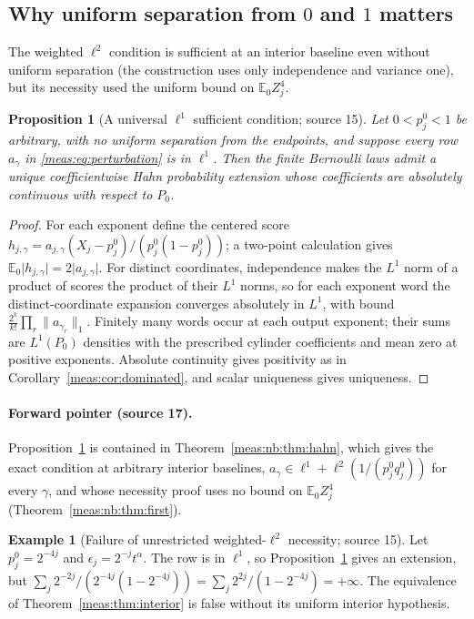 \documentclass[11pt]{article}
\numberwithin{equation}{section}
\newtheorem{proposition}[theorem]{Proposition}
\theoremstyle{definition}
\newtheorem{example}[theorem]{Example}
\theoremstyle{remark}
\newcommand{\E}{\mathbb E}
\newcommand{\norm}[1]{\lVert#1\rVert}
\newcommand{\abs}[1]{\lvert#1\rvert}
\begin{document}
\subsection{Why uniform separation from \texorpdfstring{$0$}{0} and
\texorpdfstring{$1$}{1} matters}

The weighted $\ell^2$ condition is sufficient at an interior baseline even without
uniform separation (the construction uses only independence and variance one),
but its necessity used the uniform bound on $\E_0Z_j^4$.

\begin{proposition}[A universal $\ell^1$ sufficient condition; source 15]
\label{meas:prop:general-l1}
Let $0<p_j^0<1$ be arbitrary, with no uniform separation from the endpoints, and
suppose every row $a_\gamma$ in \eqref{meas:eq:perturbation} is in $\ell^1$. Then the
finite Bernoulli laws admit a unique coefficientwise Hahn probability extension
whose coefficients are absolutely continuous with respect to $P_0$.
\end{proposition}
\begin{proof}
For each exponent define the centered score
$h_{j,\gamma}=a_{j,\gamma}(X_j-p_j^0)/(p_j^0(1-p_j^0))$; a two-point calculation gives
$\E_0\abs{h_{j,\gamma}}=2\abs{a_{j,\gamma}}$. For distinct coordinates, independence makes
the $L^1$ norm of a product of scores the product of their $L^1$ norms, so for each
exponent word the distinct-coordinate expansion converges absolutely in $L^1$,
with bound $\frac{2^k}{k!}\prod_r\norm{a_{\gamma_r}}_1$. Finitely many words occur at
each output exponent; their sums are $L^1(P_0)$ densities with the prescribed
cylinder coefficients and mean zero at positive exponents. Absolute continuity
gives positivity as in Corollary~\ref{meas:cor:dominated}, and scalar uniqueness
gives uniqueness.
\end{proof}

\paragraph{Forward pointer (source 17).} Proposition~\ref{meas:prop:general-l1} is
contained in Theorem~\ref{meas:nb:thm:hahn}, which gives the exact condition at
arbitrary interior baselines, $a_\gamma\in\ell^1+\ell^2(1/(p_j^0q_j^0))$ for every
$\gamma$, and whose necessity proof uses no bound on $\E_0Z_j^4$
(Theorem~\ref{meas:nb:thm:first}).

\begin{example}[Failure of unrestricted weighted-$\ell^2$ necessity; source 15]
\label{meas:ex:near-boundary}
Let $p_j^0=2^{-4j}$ and $\epsilon_j=2^{-j}t^\alpha$. The row is in $\ell^1$, so
Proposition~\ref{meas:prop:general-l1} gives an extension, but
$\sum_j2^{-2j}/(2^{-4j}(1-2^{-4j}))=\sum_j2^{2j}/(1-2^{-4j})=+\infty$. The
equivalence of Theorem~\ref{meas:thm:interior} is false without its uniform
interior hypothesis.
\end{example}
\end{document}
